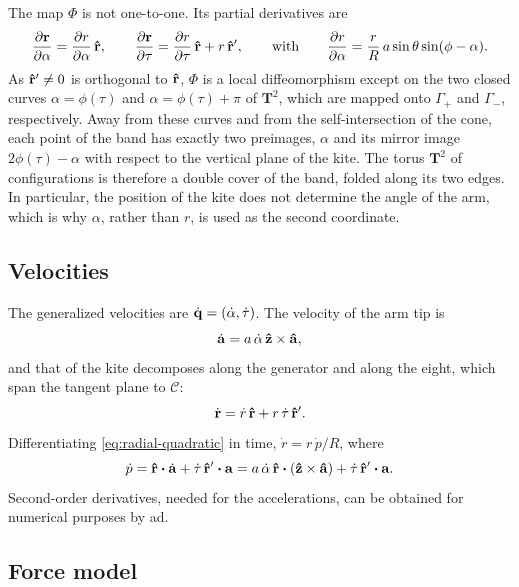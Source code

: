 The map \(\Phi\) is not one-to-one.
Its partial derivatives are
\begin{equation}
    \pdv{\vb r}{\alpha} = \pdv{r}{\alpha}\,\vu r, \qquad \pdv{\vb r}{\tau} = \pdv{r}{\tau}\,\vu r + r\,\vu r',
    \qquad\text{with}\qquad
    \pdv{r}{\alpha} = \frac{r}{R}\,a\sin\theta\sin(\phi-\alpha).
\end{equation}
As \(\vu r'\neq0\) is orthogonal to \(\vu r\), \(\Phi\) is a local diffeomorphism except on the two closed curves \(\alpha = \phi(\tau)\) and \(\alpha = \phi(\tau)+\pi\) of \(\mathbf{T}^2\), which are mapped onto \(\Gamma_+\) and \(\Gamma_-\), respectively.
Away from these curves and from the self-intersection of the cone, each point of the band has exactly two preimages, \(\alpha\) and its mirror image \(2\phi(\tau)-\alpha\) with respect to the vertical plane of the kite.
The torus \(\mathbf{T}^2\) of configurations is therefore a double cover of the band, folded along its two edges.
In particular, the position of the kite does not determine the angle of the arm, which is why \(\alpha\), rather than \(r\), is used as the second coordinate.

\subsection{Velocities} \label{sec:model-velocities}
The generalized velocities are \(\dot{\vb q} = (\dot\alpha,\dot\tau)\).
The velocity of the arm tip is
\begin{equation}
    \dot{\vb a} = a\,\dot\alpha\,\vu z\times\vu a,
\end{equation}
and that of the kite decomposes along the generator and along the eight, which span the tangent plane to \(\mathscr{C}\):
\begin{equation} \label{eq:kite-velocity}
    \dot{\vb r} = \dot r\,\vu r + r\,\dot\tau\,\vu r'.
\end{equation}
Differentiating \eqref{eq:radial-quadratic} in time, \(\dot r = r\,\dot p/R\), where
\begin{equation}
    \dot p = \vu r\vdot\dot{\vb a} + \dot\tau\,\vu r'\vdot\vb a = a\,\dot\alpha\,\vu r\vdot(\vu z\times\vu a) + \dot\tau\,\vu r'\vdot\vb a.
\end{equation}
Second-order derivatives, needed for the accelerations, can be obtained for numerical purposes by \ac{ad}.

\subsection{Force model} \label{sec:model-forces}

